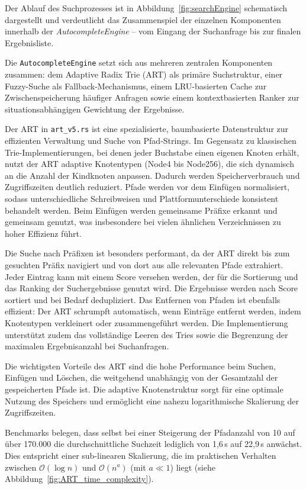 Der Ablauf des Suchprozesses ist in Abbildung~\ref{fig:searchEngine}
schematisch dargestellt und verdeutlicht das Zusammenspiel der einzelnen Komponenten
innerhalb der \textit{AutocompleteEngine} – vom Eingang der Suchanfrage bis zur finalen Ergebnisliste.

Die \verb|AutocompleteEngine| setzt sich aus mehreren zentralen Komponenten zusammen: dem Adaptive Radix Trie (ART) als primäre Suchstruktur, einer Fuzzy-Suche als Fallback-Mechanismus, einem LRU-basierten Cache zur Zwischenspeicherung häufiger Anfragen sowie einem kontextbasierten Ranker zur situationsabhängigen Gewichtung der Ergebnisse.

Der ART in \verb|art_v5.rs| ist eine spezialisierte, baumbasierte Datenstruktur zur effizienten Verwaltung und Suche von Pfad-Strings.
Im Gegensatz zu klassischen Trie-Implementierungen, bei denen jeder Buchstabe einen eigenen Knoten erhält, nutzt der ART adaptive Knotentypen (Node4 bis Node256),
die sich dynamisch an die Anzahl der Kindknoten anpassen.
Dadurch werden Speicherverbrauch und Zugriffszeiten deutlich reduziert.
Pfade werden vor dem Einfügen normalisiert, sodass unterschiedliche Schreibweisen und Plattformunterschiede konsistent behandelt werden.
Beim Einfügen werden gemeinsame Präfixe erkannt und gemeinsam genutzt,
was insbesondere bei vielen ähnlichen Verzeichnissen zu hoher Effizienz führt.

Die Suche nach Präfixen ist besonders performant, da der ART direkt bis zum gesuchten Präfix navigiert
und von dort aus alle relevanten Pfade extrahiert.
Jeder Eintrag kann mit einem Score versehen werden, der für die Sortierung und das Ranking der Suchergebnisse genutzt wird.
Die Ergebnisse werden nach Score sortiert und bei Bedarf dedupliziert.
\newpage
Das Entfernen von Pfaden ist ebenfalls effizient:
Der ART schrumpft automatisch, wenn Einträge entfernt werden, indem Knotentypen verkleinert oder zusammengeführt werden.
Die Implementierung unterstützt zudem das vollständige Leeren des Tries
sowie die Begrenzung der maximalen Ergebnisanzahl bei Suchanfragen.

Die wichtigsten Vorteile des ART sind die hohe Performance beim Suchen, Einfügen und Löschen,
die weitgehend unabhängig von der Gesamtzahl der gespeicherten Pfade ist.
Die adaptive Knotenstruktur sorgt für eine optimale Nutzung des Speichers
und ermöglicht eine nahezu logarithmische Skalierung der Zugriffszeiten.

Benchmarks belegen, dass selbst bei einer Steigerung der Pfadanzahl von 10 auf über 170.000
die durchschnittliche Suchzeit lediglich von 1{,}6\,\textmu s auf 22{,}9\,\textmu s anwächst.
Dies entspricht einer sub-linearen Skalierung,
die im praktischen Verhalten zwischen $\mathcal{O}(\log n)$ und $\mathcal{O}(n^a)$ (mit $a \ll 1$) liegt (siehe Abbildung~\ref{fig:ART_time_complexity}).

